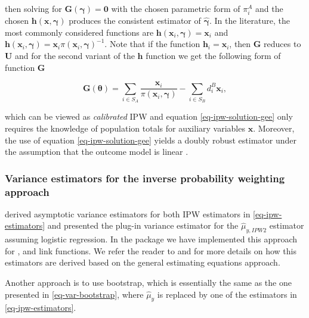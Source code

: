 \documentclass[
]{jss}
\begin{document}
then solving for \(\boldsymbol{G}(\boldsymbol{\gamma})=\boldsymbol{0}\)
with the chosen parametric form of \(\pi_i^A\) and the chosen
\(\boldsymbol{h}(\boldsymbol{x},\boldsymbol{\gamma})\) produces the
consistent estimator of \(\hat{\boldsymbol{\gamma}}\). In the
literature, the most commonly considered functions are
\(\boldsymbol{h}\left(\boldsymbol{x}_i, \boldsymbol{\gamma}\right) = \boldsymbol{x}_i\)
and
\(\boldsymbol{h}\left(\boldsymbol{x}_i, \boldsymbol{\gamma}\right) = \boldsymbol{x}_i \pi\left(\boldsymbol{x}_i, \boldsymbol{\gamma}\right)^{-1}\).
Note that if the function \(\boldsymbol{h}_i=\boldsymbol{x}_i\), then
\(\boldsymbol{G}\) reduces to \(\boldsymbol{U}\) and for the second
variant of the \(\boldsymbol{h}\) function we get the following form of
function \(\boldsymbol{G}\)

\begin{equation}
\boldsymbol{G}(\boldsymbol{\theta}) = \sum_{i \in S_A} \frac{\boldsymbol{x}_i}{\pi\left(\boldsymbol{x}_i, \boldsymbol{\gamma}\right) }-\sum_{i \in S_B} d_i^B \boldsymbol{x}_i,
\label{eq-ipw-solution-gee}
\end{equation}

which can be viewed as \textit{calibrated} IPW and equation
\eqref{eq-ipw-solution-gee} only requires the knowledge of population
totals for auxiliary variables \(\boldsymbol{x}\). Moreover, the use of
equation \eqref{eq-ipw-solution-gee} yields a doubly robust estimator
under the assumption that the outcome model is linear
\citep{kim_theory_2012}.

\subsubsection{Variance estimators for the inverse probability weighting
approach}\label{variance-estimators-for-the-inverse-probability-weighting-approach}

\citet[section 3.2]{chen2020doubly} derived asymptotic variance
estimators for both IPW estimators in \eqref{eq-ipw-estimators} and
presented the plug-in variance estimator for the \(\hat{\mu}_{y,IPW2}\)
estimator assuming logistic regression. In the package we have
implemented this approach for ,  and
 link functions. We refer the reader to
\citet[section 6.2]{wu2022statistical} and
\citet[chapter 3]{chrostowski2024statistical} for more details on how
this estimators are derived based on the general estimating equations
approach.

Another approach is to use bootstrap, which is essentially the same as
the one presented in \eqref{eq-var-bootstrap}, where \(\hat{\mu}_y\) is
replaced by one of the estimators in \eqref{eq-ipw-estimators}.
\end{document}
